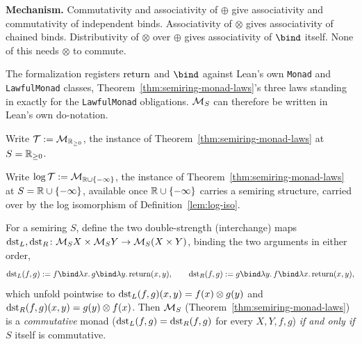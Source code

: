 \textbf{Mechanism.} Commutativity and associativity of $\oplus$ give
associativity and commutativity of independent binds. Associativity of
$\otimes$ gives associativity of chained binds. Distributivity of
$\otimes$ over $\oplus$ gives associativity of $\bind$ itself. None of
this needs $\otimes$ to commute.

The formalization registers $\mathrm{return}$ and $\bind$ against Lean's own
\texttt{Monad} and \texttt{LawfulMonad} classes, Theorem~\ref{thm:semiring-monad-laws}'s
three laws standing in exactly for the \texttt{LawfulMonad} obligations.
$\mathcal M_{S}$ can therefore be written in Lean's own do-notation.

\begin{abbreviation}
\label{abbr:tensor-monad}
\leanok
Write $\mathcal T := \mathcal M_{\mathbb R_{\ge 0}}$, the instance of
Theorem~\ref{thm:semiring-monad-laws} at $S = \mathbb R_{\ge 0}$.
\end{abbreviation}

\begin{abbreviation}
\label{abbr:log-tensor-monad}
\leanok
Write $\log\mathcal T := \mathcal M_{\mathbb R \cup \{-\infty\}}$, the instance of
Theorem~\ref{thm:semiring-monad-laws} at $S = \mathbb R \cup \{-\infty\}$, available once
$\mathbb R \cup \{-\infty\}$ carries a semiring structure, carried over by the log
isomorphism of Definition~\ref{lem:log-iso}.
\end{abbreviation}

\begin{theorem}
\label{thm:semiring-monad-commutative}
\leanok
For a semiring $S$, define the two double-strength (interchange) maps
$\mathrm{dst}_L, \mathrm{dst}_R \colon \mathcal M_{S}X \times \mathcal M_{S}Y \to \mathcal M_{S}(X\times Y)$,
binding the two arguments in either order,
\[
  \dstL(f,g) := f \bind \lambda x.\, g \bind \lambda y.\, \Ret(x,y),
  \qquad
  \dstR(f,g) := g \bind \lambda y.\, f \bind \lambda x.\, \Ret(x,y),
\]
which unfold pointwise to $\mathrm{dst}_L(f,g)(x,y) = f(x)\otimes g(y)$ and
$\mathrm{dst}_R(f,g)(x,y) = g(y)\otimes f(x)$. Then $\mathcal M_{S}$
(Theorem~\ref{thm:semiring-monad-laws}) is a \emph{commutative} monad
($\mathrm{dst}_L(f,g) = \mathrm{dst}_R(f,g)$ for every $X,Y,f,g$) \emph{if and only if}
$S$ itself is commutative.
\end{theorem}

